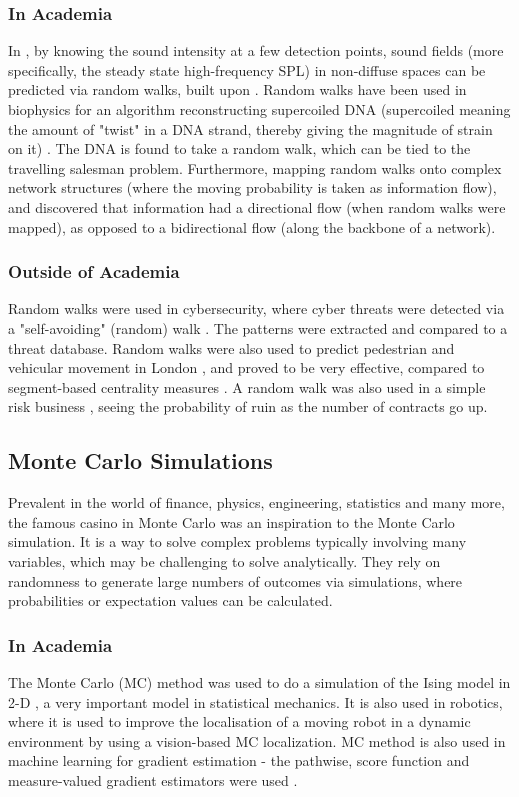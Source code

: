 \documentclass[10pt, twocolumn]{article}
\begin{document}
\subsubsection{In Academia} %
In \cite{Kruzins1982}, by knowing the sound intensity at a few detection points, sound fields (more specifically, the steady state high-frequency SPL) in non-diffuse spaces can be predicted via random walks, built upon \cite{Gerlach1975}. Random walks have been used in biophysics for an algorithm reconstructing supercoiled DNA \cite{Baba2020} (supercoiled meaning the amount of "twist" in a DNA strand, thereby giving the magnitude of strain on it) \cite{Bauer1980}. The DNA is found to take a random walk, which can be tied to the travelling salesman problem. Furthermore, mapping random walks onto complex network structures (where the moving probability is taken as information flow), and \cite{Noh2004} discovered that information had a directional flow (when random walks were mapped), as opposed to a bidirectional flow (along the backbone of a network). 

\subsubsection{Outside of Academia} %
Random walks were used in cybersecurity, where cyber threats were detected via a "self-avoiding" (random) walk \cite{Nia2016}. The patterns were extracted and compared to a threat database. Random walks were also used to predict pedestrian and vehicular movement in London \cite{Hanna2021}, and proved to be very effective, compared to segment-based centrality measures \cite{Jayasinghe2015}. A random walk was also used in a simple risk business \cite{Seal1966}, seeing the probability of ruin as the number of contracts go up.

\subsection{Monte Carlo Simulations} %
Prevalent in the world of finance, physics, engineering, statistics and many more, the famous casino in Monte Carlo was an inspiration to the Monte Carlo simulation. It is a way to solve complex problems typically involving many variables, which may be challenging to solve analytically. They rely on randomness to generate large numbers of outcomes via simulations, where probabilities or expectation values can be calculated.

\subsubsection{In Academia} %
The Monte Carlo (MC) method was used to do a simulation of the Ising model in 2-D \cite{Shekaari2021}\cite{Jindal2007}, a very important model in statistical mechanics. It is also used in robotics, where it is used to improve the localisation of a moving robot in a dynamic environment \cite{Zhao2008} by using a vision-based MC localization. MC method is also used in machine learning for gradient estimation - the pathwise, score function and measure-valued gradient estimators were used \cite{Mohamed2020}.
\end{document}
